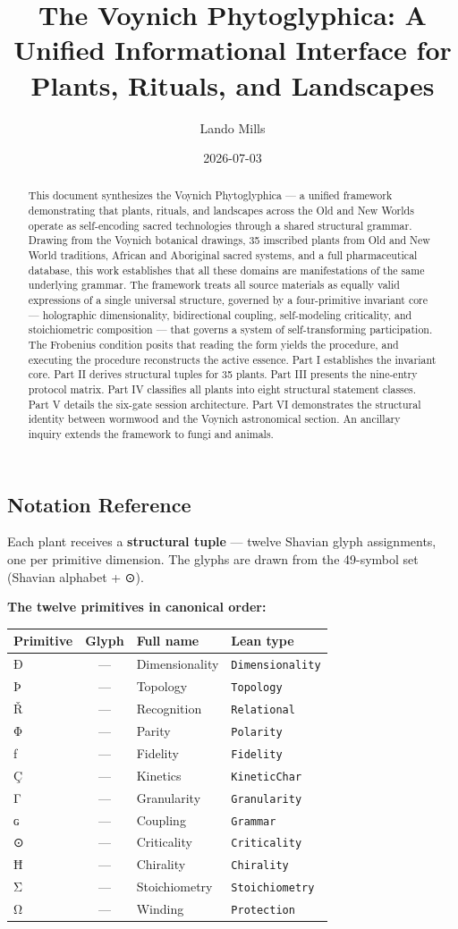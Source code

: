 \documentclass[12pt,a4paper]{article}
\title{The Voynich Phytoglyphica: A Unified Informational Interface for Plants, Rituals, and Landscapes}
\date{2026-07-03}
\author{Lando Mills}
\begin{document}
\maketitle

\begin{abstract}
This document synthesizes the Voynich Phytoglyphica — a unified framework demonstrating that plants, rituals, and landscapes across the Old and New Worlds operate as self-encoding sacred technologies through a shared structural grammar. Drawing from the Voynich botanical drawings, 35 imscribed plants from Old and New World traditions, African and Aboriginal sacred systems, and a full pharmaceutical database, this work establishes that all these domains are manifestations of the same underlying grammar. The framework treats all source materials as equally valid expressions of a single universal structure, governed by a four-primitive invariant core — holographic dimensionality, bidirectional coupling, self-modeling criticality, and stoichiometric composition — that governs a system of self-transforming participation. The Frobenius condition posits that reading the form yields the procedure, and executing the procedure reconstructs the active essence. Part I establishes the invariant core. Part II derives structural tuples for 35 plants. Part III presents the nine-entry protocol matrix. Part IV classifies all plants into eight structural statement classes. Part V details the six-gate session architecture. Part VI demonstrates the structural identity between wormwood and the Voynich astronomical section. An ancillary inquiry extends the framework to fungi and animals.
\end{abstract}
\hypertarget{notation-reference}{%
\subsection{Notation Reference}\label{notation-reference}}

Each plant receives a \textbf{structural tuple} --- twelve Shavian glyph
assignments, one per primitive dimension. The glyphs are drawn from the
49-symbol set (Shavian alphabet + ⊙).

\textbf{The twelve primitives in canonical order:}

\begin{longtable}[]{@{}lcll@{}}
\toprule
Primitive & Glyph & Full name & Lean type\tabularnewline
\midrule
\endhead
Ð & --- & Dimensionality & \texttt{Dimensionality}\tabularnewline
Þ & --- & Topology & \texttt{Topology}\tabularnewline
Ř & --- & Recognition & \texttt{Relational}\tabularnewline
Φ & --- & Parity & \texttt{Polarity}\tabularnewline
ƒ & --- & Fidelity & \texttt{Fidelity}\tabularnewline
Ç & --- & Kinetics & \texttt{KineticChar}\tabularnewline
Γ & --- & Granularity & \texttt{Granularity}\tabularnewline
ɢ & --- & Coupling & \texttt{Grammar}\tabularnewline
⊙ & --- & Criticality & \texttt{Criticality}\tabularnewline
Ħ & --- & Chirality & \texttt{Chirality}\tabularnewline
Σ & --- & Stoichiometry & \texttt{Stoichiometry}\tabularnewline
Ω & --- & Winding & \texttt{Protection}\tabularnewline
\bottomrule
\end{longtable}
\end{document}

